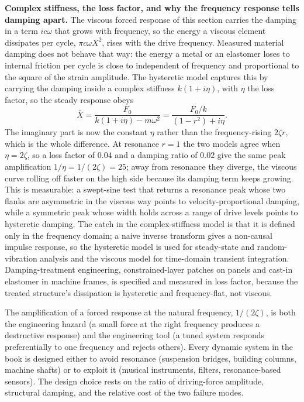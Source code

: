 \begin{mastery}
\textbf{Complex stiffness, the loss factor, and why the frequency
response tells damping apart.} The viscous forced response of this
section carries the damping in a term $ic\omega$ that grows with
frequency, so the energy a viscous element dissipates per cycle,
$\pi c\omega X^2$, rises with the drive frequency. Measured material
damping does not behave that way: the energy a metal or an elastomer
loses to internal friction per cycle is close to independent of
frequency and proportional to the square of the strain amplitude. The
hysteretic model captures this by carrying the damping inside a complex
stiffness $k(1 + i\eta)$, with $\eta$ the loss factor, so the steady
response obeys
\[
\bar{X} = \frac{F_0}{k(1 + i\eta) - m\omega^2} = \frac{F_0/k}{(1 - r^2)
+ i\eta}.
\]
The imaginary part is now the constant $\eta$ rather than the
frequency-rising $2\zeta r$, which is the whole difference. At resonance
$r = 1$ the two models agree when $\eta = 2\zeta$, so a loss factor of
$0.04$ and a damping ratio of $0.02$ give the same peak amplification
$1/\eta = 1/(2\zeta) = 25$; away from resonance they diverge, the
viscous curve rolling off faster on the high side because its damping
term keeps growing. This is measurable: a swept-sine test that returns
a resonance peak whose two flanks are asymmetric in the viscous way
points to velocity-proportional damping, while a symmetric peak whose
width holds across a range of drive levels points to hysteretic damping.
The catch in the complex-stiffness model is that it is defined only in
the frequency domain; a naive inverse transform gives a non-causal
impulse response, so the hysteretic model is used for steady-state and
random-vibration analysis and the viscous model for time-domain
transient integration. Damping-treatment engineering, constrained-layer
patches on panels and cast-in elastomer in machine frames, is specified
and measured in loss factor, because the treated structure's dissipation
is hysteretic and frequency-flat, not viscous.
\end{mastery}

\begin{principle}
The amplification of a forced response at the natural frequency,
$1/(2\zeta)$, is both the engineering hazard (a small force at the
right frequency produces a destructive response) and the
engineering tool (a tuned system responds preferentially to one
frequency and rejects others). Every dynamic system in the book is
designed either to avoid resonance (suspension bridges, building
columns, machine shafts) or to exploit it (musical instruments,
filters, resonance-based sensors). The design choice rests on the
ratio of driving-force amplitude, structural damping, and the
relative cost of the two failure modes.
\end{principle}


